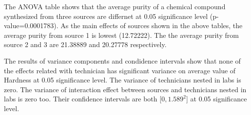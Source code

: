 \documentclass[12pt,]{article}
\begin{document}
The ANOVA table shows that the average purity of a chemical compound
synthesized from three sources are differnet at 0.05 significance level
(p-value=0.0001783). As the main effects of sources shown in the above
tables, the average purity from source 1 is lowest (12.72222). The the
average purity from source 2 and 3 are 21.38889 and 20.27778
respectively.

The results of variance components and condidence intervals show that
none of the effects related with technician has significant variance on
average value of Hardness at 0.05 significance level. The variance of
technicians nested in labs is zero. The variance of interaction effect
between sources and technicians nested in labs is zero too. Their
confidence intervals are both {[}\(0,1.589^2\){]} at 0.05 significance
level.
\end{document}
